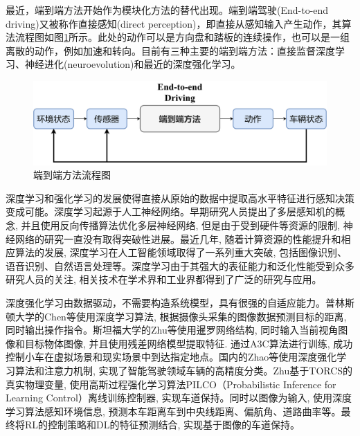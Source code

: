 最近，端到端方法开始作为模块化方法的替代出现。端到端驾驶(End-to-end driving)又被称作直接感知(direct perception)\cite{2015DeepDriving}，即直接从感知输入产生动作，其算法流程图如图\ref{端到端方法流程图}所示。此处的动作可以是方向盘和踏板的连续操作，也可以是一组离散的动作，例如加速和转向。目前有三种主要的端到端方法：直接监督深度学习\cite{1989Alvinn}\cite{2016End}、神经进化\cite{1996Evolution}(neuroevolution)和最近的深度强化学习\cite{2017DRL_end_to_end}。

\begin{figure}[htbp]
    \vspace{13pt} %
    \centering
    \includegraphics[width=1.0\textwidth]{images/chapter1/EndtoEnd_structure.png}
    \caption{端到端方法流程图}\label{端到端方法流程图} %
\end{figure}

深度学习和强化学习的发展使得直接从原始的数据中提取高水平特征进行感知决策变成可能。深度学习起源于人工神经网络。早期研究人员提出了多层感知机的概念, 并且使用反向传播算法优化多层神经网络, 但是由于受到硬件等资源的限制, 神经网络的研究一直没有取得突破性进展。最近几年, 随着计算资源的性能提升和相应算法的发展, 深度学习在人工智能领域取得了一系列重大突破, 包括图像识别、语音识别、自然语言处理等。深度学习由于其强大的表征能力和泛化性能受到众多研究人员的关注, 相关技术在学术界和工业界都得到了广泛的研究与应用。

深度强化学习由数据驱动，不需要构造系统模型，具有很强的自适应能力。普林斯顿大学的Chen等使用深度学习算法, 根据摄像头采集的图像数据预测目标的距离, 同时输出操作指令\cite{2015DeepDriving}。斯坦福大学的Zhu等使用暹罗网络结构, 同时输入当前视角图像和目标物体图像, 并且使用残差网络模型提取特征. 通过A3C算法进行训练, 成功控制小车在虚拟场景和现实场景中到达指定地点\cite{2016Target}。国内的Zhao等使用深度强化学习算法和注意力机制, 实现了智能驾驶领域车辆的高精度分类\cite{2017Deep}。Zhu基于TORCS的真实物理变量, 使用高斯过程强化学习算法PILCO（Probabilistic Inference for Learning Control）离线训练控制器, 实现车道保持。同时以图像为输入, 使用深度学习算法感知环境信息, 预测本车距离车到中央线距离、偏航角、道路曲率等。最终将RL的控制策略和DL的特征预测结合, 实现基于图像的车道保持。

